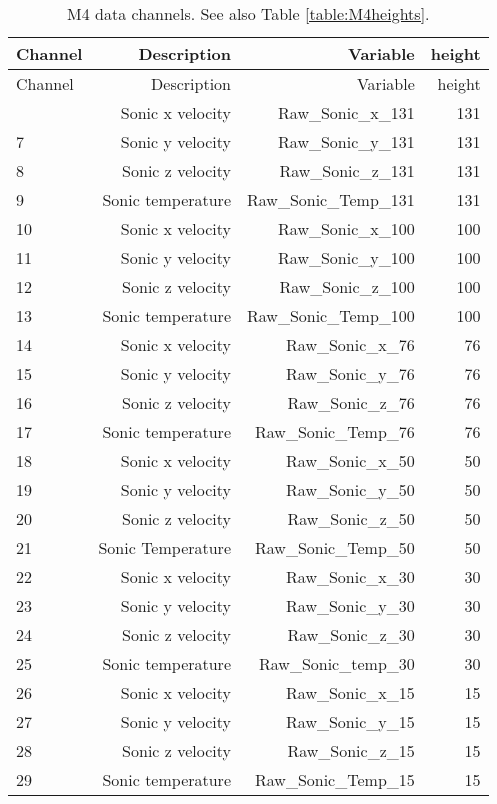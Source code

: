 \begin{longtable}{lrrr}
\caption[M4 channels]{M4 data channels. See also Table \ref{table:M4heights}.\label{table:M4channels}}\\
\toprule
Channel & Description & Variable & height\\
\midrule
\endfirsthead
\toprule
Channel & Description & Variable & height\\
\midrule
\endhead
\bottomrule
\endfoot
\bottomrule
\endlastfoot
6 & Sonic x velocity & Raw\_Sonic\_x\_131 & 131\\
7 & Sonic y velocity & Raw\_Sonic\_y\_131 & 131\\
8 & Sonic z velocity & Raw\_Sonic\_z\_131 & 131\\
9 & Sonic temperature & Raw\_Sonic\_Temp\_131 & 131\\
10 & Sonic x velocity & Raw\_Sonic\_x\_100 & 100\\
11 & Sonic y velocity & Raw\_Sonic\_y\_100 & 100\\
12 & Sonic z velocity & Raw\_Sonic\_z\_100 & 100\\
13 & Sonic temperature & Raw\_Sonic\_Temp\_100 & 100\\
14 & Sonic x velocity & Raw\_Sonic\_x\_76 & 76\\
15 & Sonic y velocity & Raw\_Sonic\_y\_76 & 76\\
16 & Sonic z velocity & Raw\_Sonic\_z\_76 & 76\\
17 & Sonic temperature & Raw\_Sonic\_Temp\_76 & 76\\
18 & Sonic x velocity & Raw\_Sonic\_x\_50 & 50\\
19 & Sonic y velocity & Raw\_Sonic\_y\_50 & 50\\
20 & Sonic z velocity & Raw\_Sonic\_z\_50 & 50\\
21 & Sonic Temperature & Raw\_Sonic\_Temp\_50 & 50\\
22 & Sonic x velocity & Raw\_Sonic\_x\_30 & 30\\
23 & Sonic y velocity & Raw\_Sonic\_y\_30 & 30\\
24 & Sonic z velocity & Raw\_Sonic\_z\_30 & 30\\
25 & Sonic temperature & Raw\_Sonic\_temp\_30 & 30\\
26 & Sonic x velocity & Raw\_Sonic\_x\_15 & 15\\
27 & Sonic y velocity & Raw\_Sonic\_y\_15 & 15\\
28 & Sonic z velocity & Raw\_Sonic\_z\_15 & 15\\
29 & Sonic temperature & Raw\_Sonic\_Temp\_15 & 15\\

\end{longtable}
